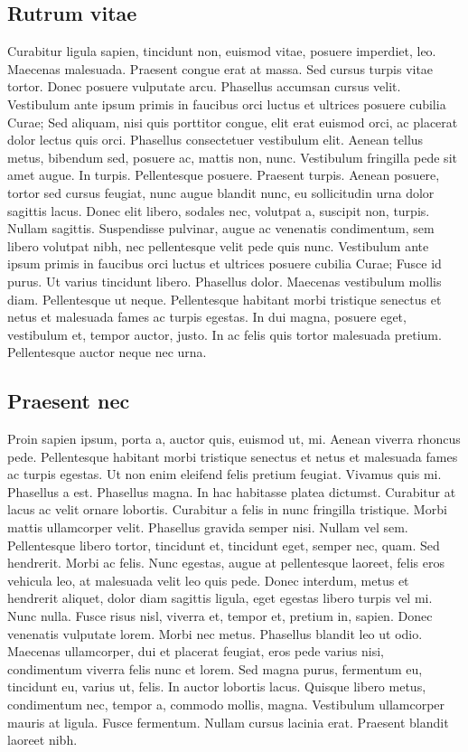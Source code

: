 \documentclass[a4paper,11pt]{scrartcl}
\begin{document}
 \subsection{Rutrum vitae}
 Curabitur ligula sapien, tincidunt non, euismod vitae, posuere imperdiet, leo. Maecenas malesuada. Praesent congue erat at massa. Sed cursus turpis vitae tortor. Donec posuere vulputate arcu. Phasellus accumsan cursus velit. Vestibulum ante ipsum primis in faucibus orci luctus et ultrices posuere cubilia Curae; Sed aliquam, nisi quis porttitor congue, elit erat euismod orci, ac placerat dolor lectus quis orci. Phasellus consectetuer vestibulum elit. Aenean tellus metus, bibendum sed, posuere ac, mattis non, nunc. Vestibulum fringilla pede sit amet augue. In turpis. Pellentesque posuere. Praesent turpis. Aenean posuere, tortor sed cursus feugiat, nunc augue blandit nunc, eu sollicitudin urna dolor sagittis lacus. Donec elit libero, sodales nec, volutpat a, suscipit non, turpis. Nullam sagittis. Suspendisse pulvinar, augue ac venenatis condimentum, sem libero volutpat nibh, nec pellentesque velit pede quis nunc. Vestibulum ante ipsum primis in faucibus orci luctus et ultrices posuere cubilia Curae; Fusce id purus. Ut varius tincidunt libero. Phasellus dolor. Maecenas vestibulum mollis diam. Pellentesque ut neque. Pellentesque habitant morbi tristique senectus et netus et malesuada fames ac turpis egestas. In dui magna, posuere eget, vestibulum et, tempor auctor, justo. In ac felis quis tortor malesuada pretium. Pellentesque auctor neque nec urna.
 
 \subsection{Praesent nec}
 Proin sapien ipsum, porta a, auctor quis, euismod ut, mi. Aenean viverra rhoncus pede. Pellentesque habitant morbi tristique senectus et netus et malesuada fames ac turpis egestas. Ut non enim eleifend felis pretium feugiat. Vivamus quis mi. Phasellus a est. Phasellus magna. In hac habitasse platea dictumst. Curabitur at lacus ac velit ornare lobortis. Curabitur a felis in nunc fringilla tristique. Morbi mattis ullamcorper velit. Phasellus gravida semper nisi. Nullam vel sem. Pellentesque libero tortor, tincidunt et, tincidunt eget, semper nec, quam. Sed hendrerit. Morbi ac felis. Nunc egestas, augue at pellentesque laoreet, felis eros vehicula leo, at malesuada velit leo quis pede. Donec interdum, metus et hendrerit aliquet, dolor diam sagittis ligula, eget egestas libero turpis vel mi. Nunc nulla. Fusce risus nisl, viverra et, tempor et, pretium in, sapien. Donec venenatis vulputate lorem. Morbi nec metus. Phasellus blandit leo ut odio. Maecenas ullamcorper, dui et placerat feugiat, eros pede varius nisi, condimentum viverra felis nunc et lorem. Sed magna purus, fermentum eu, tincidunt eu, varius ut, felis. In auctor lobortis lacus. Quisque libero metus, condimentum nec, tempor a, commodo mollis, magna. Vestibulum ullamcorper mauris at ligula. Fusce fermentum. Nullam cursus lacinia erat. Praesent blandit laoreet nibh.
 
\nocite{*}


\end{document}
